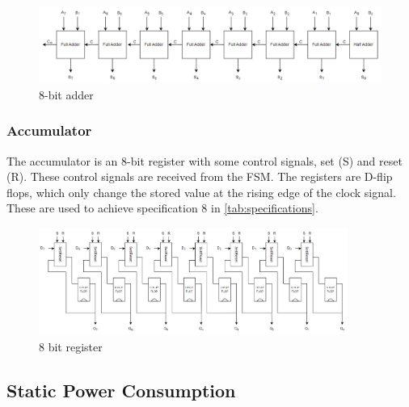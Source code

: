 \begin{figure}[H]
    \centering
    \includegraphics[width=\textwidth]{Figures/8bitadder.png}
    \caption{8-bit adder}
    \label{fig:adder-blokk}
\end{figure}

\subsubsection{Accumulator}
The accumulator is an 8-bit register with some control signals, set (S) and reset (R). These control signals are received from the FSM. The registers are D-flip flops, which only change the stored value at the rising edge of the clock signal. These are used to achieve specification 8 in \autoref{tab:specifications}. 

\begin{figure}[H]
    \centering
    \includegraphics[width=0.9\textwidth]{Figures/8bitRegister.png}
    \caption{8 bit register}
    \label{fig:8bitregister}
\end{figure}



\subsection{Static Power Consumption}
\label{subsec:low_power}

